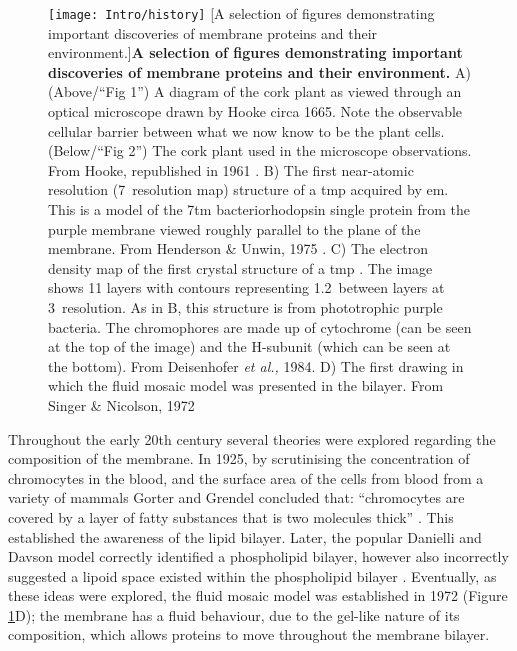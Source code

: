 \begin{figure}[ht!]
\centering
\texttt{[image: Intro/history]}
		[A selection of figures demonstrating important discoveries of membrane proteins and their environment.]{\textbf{A selection of figures demonstrating important discoveries of membrane proteins and their environment.}
		A) (Above/``Fig 1'') A diagram of the cork plant as viewed through an optical microscope drawn by Hooke circa 1665.
		Note the observable cellular barrier between what we now know to be the plant cells.
		(Below/``Fig 2'') The cork plant used in the microscope observations.
		From Hooke, republished in 1961 \cite{hooke1961micrographia}.
		B) The first near\--atomic resolution (7\angstrom~resolution map) structure of a \gls{tmp} acquired by \gls{em}.
		This is a model of the 7\gls{tm} bacteriorhodopsin single protein from the purple membrane viewed roughly parallel to the plane of the membrane.
		From Henderson \& Unwin, 1975 \cite{Henderson1975}.
		C) The electron density map of the first crystal structure of a \gls{tmp} \cite{Deisenhofer1984}.
		The image shows 11 layers with contours representing 1.2\angstrom~between layers at 3\angstrom~resolution.
		As in B, this structure is from phototrophic purple bacteria.
		The chromophores are made up of cytochrome (can be seen at the top of the image) and the H\--subunit (which can be seen at the bottom).
		From Deisenhofer \textit{et al.,} 1984.
		D) The first drawing in which the fluid mosaic model was presented in the bilayer.
		From Singer \& Nicolson, 1972 \cite{Singer1972}
		}

\label{fig:history}
\end{figure}

Throughout the early 20th century several theories were explored regarding the composition of the membrane.
In 1925, by scrutinising the concentration of chromocytes in the blood, and the surface area of the cells from blood from a variety of mammals Gorter and Grendel concluded that: ``chromocytes are covered by a layer of fatty substances that is two molecules thick'' \cite{Gorter1925}.
This established the awareness of the lipid bilayer.
Later, the popular Danielli and Davson model correctly identified a phospholipid bilayer, however also incorrectly suggested a lipoid space existed within the phospholipid bilayer \cite{Danielli1935}.
Eventually, as these ideas were explored, the fluid mosaic model was established in 1972 (Figure \ref{fig:history}D)\cite{Singer1972}; the membrane has a fluid behaviour, due to the gel\--like nature of its composition, which allows proteins to move throughout the membrane bilayer.

